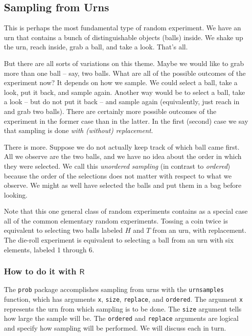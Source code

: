 \documentclass[captions=tableheading]{scrbook}
\begin{document}
\subsection{Sampling from Urns}
\label{sec-4-1-2}
\label{sub-sampling-from-urns}


This is perhaps the most fundamental type of random experiment. We have an urn that contains a bunch of distinguishable objects (balls) inside. We shake up the urn, reach inside, grab a ball, and take a look. That's all.

But there are all sorts of variations on this theme. Maybe we would like to grab more than one ball -- say, two balls. What are all of the possible outcomes of the experiment now? It depends on how we sample. We could select a ball, take a look, put it back, and sample again. Another way would be to select a ball, take a look -- but do not put it back -- and sample again (equivalently, just reach in and grab two balls). There are certainly more possible outcomes of the experiment in the former case than in the latter. In the first (second) case we say that sampling is done \emph{with (without) replacement}.

There is more. Suppose we do not actually keep track of which ball came first. All we observe are the two balls, and we have no idea about the order in which they were selected. We call this \emph{unordered sampling} (in contrast to \emph{ordered}) because the order of the selections does not matter with respect to what we observe. We might as well have selected the balls and put them in a bag before looking.

Note that this one general class of random experiments contains as a special case all of the common elementary random experiments. Tossing a coin twice is equivalent to selecting two balls labeled \(H\) and \(T\) from an urn, with replacement. The die-roll experiment is equivalent to selecting a ball from an urn with six elements, labeled 1 through 6.
\subsubsection{How to do it with \(\mathsf{R}\)}
\label{sec-4-1-2-1}


The \texttt{prob} package accomplishes sampling from urns with the \texttt{urnsamples} function, which has arguments \texttt{x}, \texttt{size}, \texttt{replace}, and \texttt{ordered}. The argument \texttt{x} represents the urn from which sampling is to be done. The \texttt{size} argument tells how large the sample will be. The \texttt{ordered} and \texttt{replace} arguments are logical and specify how sampling will be performed. We will discuss each in turn.
\end{document}
